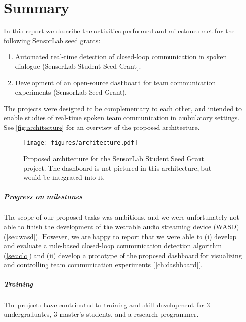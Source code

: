 \chapter{Summary}

In this report we describe the activities performed and milestones met for the
following SensorLab seed grants:

\begin{enumerate}
    \item Automated real-time detection of closed-loop communication in spoken
        dialogue (SensorLab Student Seed Grant).
    \item Development of an open-source dashboard for team communication
        experiments (SensorLab Seed Grant).
\end{enumerate}

The projects were designed to be complementary to each other, and intended to
enable studies of real-time spoken team communication in ambulatory settings.
See \autoref{fig:architecture} for an overview of the proposed architecture.

\begin{figure}
    \texttt{[image: figures/architecture.pdf]}
    \caption{%
        Proposed architecture for the SensorLab Student Seed Grant
        project. The dashboard is not pictured in this architecture, but would be
        integrated into it.
    }
    \label{fig:architecture}
\end{figure}


\paragraph{Progress on milestones} The scope of our proposed tasks was
ambitious, and we were unfortunately not able to finish the development of the
wearable audio streaming device (WASD) (\autoref{sec:wasd}).  However, we are
happy to report that we were able to (i) develop and evaluate a rule-based
closed-loop communication detection algorithm (\autoref{sec:clc}) and (ii)
develop a prototype of the proposed dashboard for visualizing and controlling
team communication experiments (\autoref{ch:dashboard}).

\paragraph{Training} The projects have contributed to training and skill
development for 3 undergraduates, 3 master's students, and a research
programmer.

